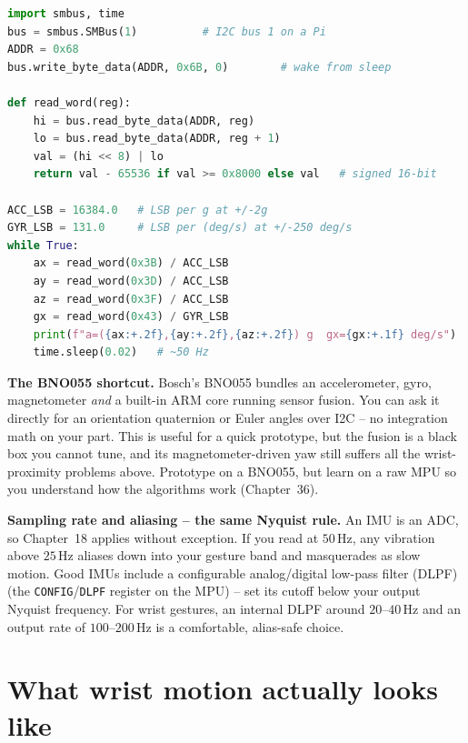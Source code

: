 \begin{lstlisting}[language=Python,caption={Minimal MPU-6050 read over I2C on a Raspberry Pi.},label=ch34:py-mpu]
import smbus, time
bus = smbus.SMBus(1)          # I2C bus 1 on a Pi
ADDR = 0x68
bus.write_byte_data(ADDR, 0x6B, 0)        # wake from sleep

def read_word(reg):
    hi = bus.read_byte_data(ADDR, reg)
    lo = bus.read_byte_data(ADDR, reg + 1)
    val = (hi << 8) | lo
    return val - 65536 if val >= 0x8000 else val   # signed 16-bit

ACC_LSB = 16384.0   # LSB per g at +/-2g
GYR_LSB = 131.0     # LSB per (deg/s) at +/-250 deg/s
while True:
    ax = read_word(0x3B) / ACC_LSB
    ay = read_word(0x3D) / ACC_LSB
    az = read_word(0x3F) / ACC_LSB
    gx = read_word(0x43) / GYR_LSB
    print(f"a=({ax:+.2f},{ay:+.2f},{az:+.2f}) g  gx={gx:+.1f} deg/s")
    time.sleep(0.02)   # ~50 Hz
\end{lstlisting}

\begin{buildbox}
\textbf{The BNO055 shortcut.} Bosch's BNO055 bundles an accelerometer, gyro,
magnetometer \emph{and} a built-in ARM core running sensor fusion. You can ask it
directly for an orientation quaternion or Euler angles over I2C -- no integration math
on your part. This is useful for a quick prototype, but the fusion is a black box you cannot tune, and its magnetometer-driven yaw still suffers all the wrist-proximity problems above. Prototype on a BNO055, but learn on a raw MPU so you understand how the algorithms work (Chapter~36).
\end{buildbox}

\begin{focusbox}
\textbf{Sampling rate and aliasing -- the same Nyquist rule.} An IMU is an ADC, so
Chapter~18 applies without exception. If you read at $50\,\mathrm{Hz}$, any vibration
above $25\,\mathrm{Hz}$ aliases down into your gesture band and masquerades as slow
motion. Good IMUs include a configurable analog/digital low-pass filter (DLPF) (the
\texttt{CONFIG}/\texttt{DLPF} register on the MPU) -- set its cutoff below your output
Nyquist frequency. For wrist gestures, an internal DLPF around $20$--$40\,\mathrm{Hz}$
and an output rate of $100$--$200\,\mathrm{Hz}$ is a comfortable, alias-safe choice.
\end{focusbox}

\section{What wrist motion actually looks like}
\label{ch34:wrist-traces}

